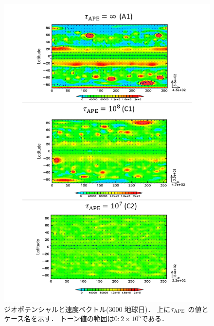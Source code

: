 \documentclass[a4j,12pt,openbib,oneside]{jreport}
\begin{document}
\begin{figure}[ht]
  \begin{center}
    \includegraphics[clip,width=14cm]{./fig/result/case2/case2_phi.png}
    \caption{
      \footnotesize{ジオポテンシャルと速度ベクトル(3000 地球日)．
上に$\tau_{\rm{APE}}$ の値とケース名を示す．
トーン値の範囲は$0:2 \times 10^5$である．
      }
    }
    \label{fig:case2_phi1}
  \end{center}
\end{figure}
%
%
\end{document}
